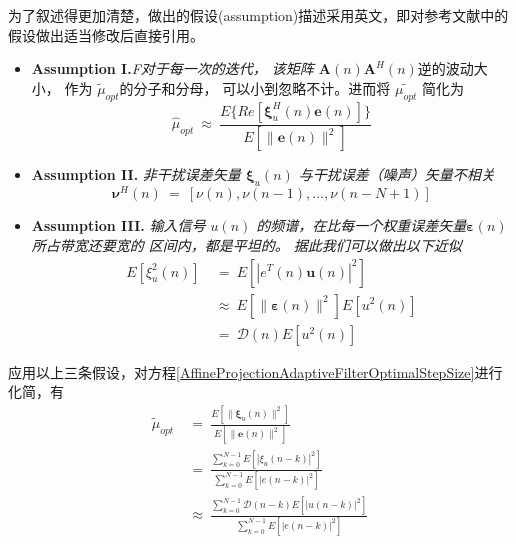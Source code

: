 为了叙述得更加清楚，做出的假设(assumption)描述采用英文，即对参考文献中的假设做出适当修改后直接引用。
\begin{itemize}
  \item \textbf{Assumption I.}\quad \emph{F对于每一次的迭代， 该矩阵 $\mathbf{A}(n)\mathbf{A}^{H}(n)$}逆的波动大小， 作为
  $\tilde{\mu}_{opt}$的分子和分母， 可以小到忽略不计。进而将 $\tilde{\mu_{opt}}$ 简化为
  \begin{equation}
    \hat{\mu}_{opt}~\approx~\frac{E\{Re[\boldsymbol{\xi}^{H}_{u}(n)\mathbf{e}(n)]\}}
    {E[\|\mathbf{e}(n)\|^{2}]}
  \end{equation}


  \item \textbf{Assumption II.} \quad \emph{非干扰误差矢量 $\boldsymbol{\xi}_{u}(n)$ 与干扰误差（噪声）矢量不相关}
  \begin{equation}
    \boldsymbol{\nu}^{H}(n)~=~[\nu(n),\nu(n-1),...,\nu(n-N+1)]
  \end{equation}

  \item \textbf{Assumption III.} \quad \emph{输入信号 $u(n)$ 的频谱，在比每一个权重误差矢量$\boldsymbol{\varepsilon}(n)$所占带宽还要宽的
  区间内，都是平坦的。 据此我们可以做出以下近似}
  \begin{equation}
  \begin{split}
    E[\xi^{2}_{u}(n)] & ~=~ E[|e^{T}(n)\mathbf{u}(n)|^{2}]\\
    & ~\approx~E[\|\boldsymbol{\varepsilon}(n)\|^{2}]E[u^{2}(n)]\\
    & ~=~\mathscr{D}(n)E[u^{2}(n)]
  \end{split}
  \end{equation}


\end{itemize}
应用以上三条假设，对方程\eqref{AffineProjectionAdaptiveFilterOptimalStepSize}进行化简，有
\begin{equation}
\begin{split}
\tilde{\mu}_{opt} & ~=~ \frac{E[\|\boldsymbol{\xi}_{u}(n)\|^{2}]}
    {E[\|\mathbf{e}(n)\|^{2}]}\\[15pt]
    & ~=~ \frac{\displaystyle{\sum^{N-1}_{k=0}}E[|\xi_{u}(n-k)|^{2}]}
    {\displaystyle{\sum^{N-1}_{k=0}}E[|e(n-k)|^{2}]}\\[15pt]
    & ~\approx~ \frac{\displaystyle{\sum^{N-1}_{k=0}}\mathscr{D}(n-k)E[|u(n-k)|^{2}]}
    {\displaystyle{\sum^{N-1}_{k=0}}E[|e(n-k)|^{2}]}
\end{split}
\end{equation}


